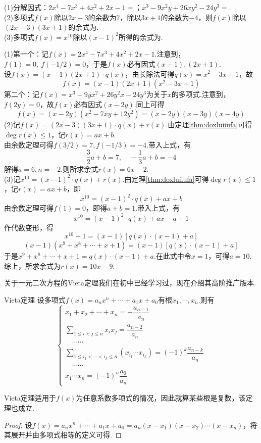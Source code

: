 \documentclass[lang=cn, zihao=5]{elegantbook}
\newcommand{\tk}{\uline{\hspace{4em}}}
\begin{document}
\begin{example}
	(1)分解因式：$2x^4-7x^3+4x^2+2x-1=$\tk ；$x^3-9x^2y+26xy^2-24y^3=$\tk . \\
	(2)多项式$f(x)$除以$2x-3$的余数为$7$，除以$3x+1$的余数为$-4$，则$f(x)$除以$(2x-3)(3x+1)$的余式为\tk . \\
	(3)多项式$f(x)=x^{10}$除以$(x-1)^2$所得的余式为\tk .
\end{example}
\begin{solution}
	(1)第一个：记$f(x)=2x^4-7x^3+4x^2+2x-1$.注意到，$f(1)=0,~f(-1/2)=0$，于是$f(x)$必有因式$(x-1),(2x+1)$. \\
	设$f(x)=(x-1)(2x+1) \cdot q(x)$，由长除法可得$q(x)=x^2-3x+1$，故$$f(x)=(x-1)(2x+1)(x^2-3x+1)$$
	第二个：记$f(x)=x^3-9yx^2+26y^2x-24y^3$为关于$x$的多项式.注意到，$f(2y)=0$，故$f(x)$必有因式$(x-2y)$.同上可得$$f(x)=(x-2y)(x^2-7xy+12y^2)=(x-2y)(x-3y)(x-4y)$$
	(2)记$f(x)=(2x-3)(3x+1) \cdot q(x) + r(x)$.由定理\ref{thm:doxluiiufa}可得$\deg r(x) \leq 1$，记$r(x)=ax+b$. \\
	由余数定理可得$f(3/2)=7,f(-1/3)=-4$.带入上式，有$$\frac{3}{2}a+b=7,\quad -\frac{1}{3}a+b=-4$$
	解得$a=6,n=-2$.则所求余式$r(x)=6x-2$. \\
	(3)记$x^{10}=(x-1)^2 \cdot q(x) + r(x)$.由定理\ref{thm:doxluiiufa}可得$\deg r(x) \leq 1$，记$r(x)=ax+b$，即$$x^{10} = (x-1)^2 \cdot q(x) + ax+b$$
	由余数定理可得$f(1)=0$，即得$a+b=1$.带入上式，有$$x^{10} = (x-1)^2 \cdot q(x) + ax-a+1$$
	作代数变形，得
	$$x^{10}-1 = (x-1)[q(x) \cdot (x-1)+a]$$
	$$(x-1)(x^9+x^8+ \cdots +x+1) = (x-1)[q(x) \cdot (x-1)+a]$$
	于是$x^9+x^8+ \cdots +x+1 = q(x) \cdot (x-1)+a$.在此式中令$x=1$，可得$a=10$. \\
	综上，所求余式为$r(x)=10x-9$.
\end{solution}

关于一元二次方程的Vieta定理我们在初中已经学习过，现在介绍其高阶推广版本.

\begin{theorem}{Vieta定理}
	设多项式$f(x)=a_nx^n + \cdots + a_1x + a_0$有根$x_1, \cdots ,x_n$.则有$$\begin{cases}
		x_1+x_2+ \cdots + x_n=-\dfrac{a_{n-1}}{a_n} \\
		{\displaystyle \sum_{1 \leq i < j \leq n} x_ix_j} = \dfrac{a_{n-2}}{a_n} \\
		\quad \cdots \cdots \\
		{\displaystyle \sum_{1 \leq i_1 < \cdots < i_k \leq n} (x_{i_1} \cdots x_{i_k})} = (-1)^{k} \dfrac{a_{n-k}}{a_n} \\
		\quad \cdots \cdots \\
		x_1 \cdots x_n = (-1)^{n} \dfrac{a_0}{a_n}
	\end{cases}$$
\end{theorem}
\begin{remark}
	Vieta定理适用于$f(x)$为任意系数多项式的情况，因此就算某些根是复数，该定理也成立.
\end{remark}
\begin{proof}
	设$f(x)=a_nx^n + \cdots + a_1x + a_0=a_n(x-x_1)(x-x_2) \cdots (x-x_n)$，将其展开并由多项式相等的定义可得.
\end{proof}
\end{document}
